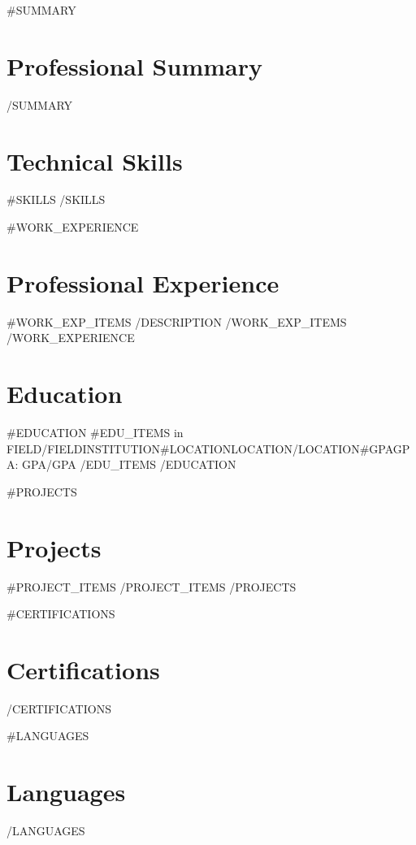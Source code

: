 \documentclass[11pt,a4paper,sans]{moderncv}
\begin{document}
\makecvtitle

{{#SUMMARY}}
\section{Professional Summary}
{{/SUMMARY}}

\section{Technical Skills}
{{#SKILLS}}
{{/SKILLS}}

{{#WORK_EXPERIENCE}}
\section{Professional Experience}
{{#WORK_EXP_ITEMS}}
{{/DESCRIPTION}}
{{/WORK_EXP_ITEMS}}
{{/WORK_EXPERIENCE}}

\section{Education}
{{#EDUCATION}}
{{#EDU_ITEMS}}
 in {{{FIELD}}}{{/FIELD}}{{{INSTITUTION}}}{{#LOCATION}}{{{LOCATION}}}{{/LOCATION}}{{#GPA}}{GPA: {{{GPA}}}}{{/GPA}}{}
{{/EDU_ITEMS}}
{{/EDUCATION}}

{{#PROJECTS}}
\section{Projects}
{{#PROJECT_ITEMS}}
{{/PROJECT_ITEMS}}
{{/PROJECTS}}

{{#CERTIFICATIONS}}
\section{Certifications}
{{/CERTIFICATIONS}}

{{#LANGUAGES}}
\section{Languages}
{{/LANGUAGES}}
\end{document}
